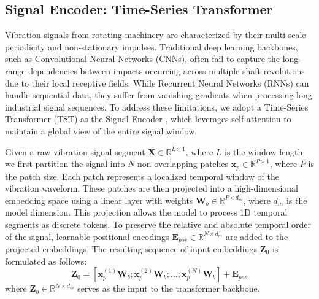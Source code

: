 \subsection{Signal Encoder: Time-Series Transformer}
Vibration signals from rotating machinery are characterized by their multi-scale periodicity and non-stationary impulses. Traditional deep learning backbones, such as Convolutional Neural Networks (CNNs), often fail to capture the long-range dependencies between impacts occurring across multiple shaft revolutions due to their local receptive fields. While Recurrent Neural Networks (RNNs) can handle sequential data, they suffer from vanishing gradients when processing long industrial signal sequences. To address these limitations, we adopt a Time-Series Transformer (TST) as the Signal Encoder \cite{zerveas2021transformer}, which leverages self-attention to maintain a global view of the entire signal window.

Given a raw vibration signal segment $\mathbf{X} \in \mathbb{R}^{L \times 1}$, where $L$ is the window length, we first partition the signal into $N$ non-overlapping patches $\mathbf{x}_p \in \mathbb{R}^{P \times 1}$, where $P$ is the patch size. Each patch represents a localized temporal window of the vibration waveform. These patches are then projected into a high-dimensional embedding space using a linear layer with weights $\mathbf{W}_b \in \mathbb{R}^{P \times d_m}$, where $d_m$ is the model dimension. This projection allows the model to process 1D temporal segments as discrete tokens. To preserve the relative and absolute temporal order of the signal, learnable positional encodings $\mathbf{E}_{pos} \in \mathbb{R}^{N \times d_m}$ are added to the projected embeddings. The resulting sequence of input embeddings $\mathbf{Z}_0$ is formulated as follows:
\begin{equation}
\mathbf{Z}_0 = [\mathbf{x}_p^{(1)}\mathbf{W}_b; \mathbf{x}_p^{(2)}\mathbf{W}_b; \dots; \mathbf{x}_p^{(N)}\mathbf{W}_b] + \mathbf{E}_{pos}
\end{equation}
where $\mathbf{Z}_0 \in \mathbb{R}^{N \times d_m}$ serves as the input to the transformer backbone.

